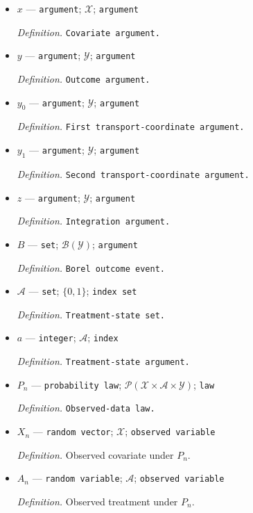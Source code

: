 \documentclass{article}
\begin{document}
\begin{itemize}
  \item \(x\) --- \texttt{argument}; \(\mathcal X\); \texttt{argument}
  \par\smallskip\noindent\emph{Definition.} \texttt{Covariate argument.}
  \item \(y\) --- \texttt{argument}; \(\mathcal Y\); \texttt{argument}
  \par\smallskip\noindent\emph{Definition.} \texttt{Outcome argument.}
  \item \(y_0\) --- \texttt{argument}; \(\mathcal Y\); \texttt{argument}
  \par\smallskip\noindent\emph{Definition.} \texttt{First transport-\allowbreak{}coordinate argument.}
  \item \(y_1\) --- \texttt{argument}; \(\mathcal Y\); \texttt{argument}
  \par\smallskip\noindent\emph{Definition.} \texttt{Second transport-\allowbreak{}coordinate argument.}
  \item \(z\) --- \texttt{argument}; \(\mathcal Y\); \texttt{argument}
  \par\smallskip\noindent\emph{Definition.} \texttt{Integration argument.}
  \item \(B\) --- \texttt{set}; \(\mathcal B(\mathcal Y)\); \texttt{argument}
  \par\smallskip\noindent\emph{Definition.} \texttt{Borel outcome event.}
  \item \(\mathcal A\) --- \texttt{set}; \(\{0,1\}\); \texttt{index set}
  \par\smallskip\noindent\emph{Definition.} \texttt{Treatment-\allowbreak{}state set.}
  \item \(a\) --- \texttt{integer}; \(\mathcal A\); \texttt{index}
  \par\smallskip\noindent\emph{Definition.} \texttt{Treatment-\allowbreak{}state argument.}
  \item \(P_n\) --- \texttt{probability law}; \(\mathcal P(\mathcal X\times\mathcal A\times\mathcal Y)\); \texttt{law}
  \par\smallskip\noindent\emph{Definition.} \texttt{Observed-\allowbreak{}data law.}
  \item \(X_n\) --- \texttt{random vector}; \(\mathcal X\); \texttt{observed variable}
  \par\smallskip\noindent\emph{Definition.} Observed covariate under \(P_n\).
  \item \(A_n\) --- \texttt{random variable}; \(\mathcal A\); \texttt{observed variable}
  \par\smallskip\noindent\emph{Definition.} Observed treatment under \(P_n\).

\end{itemize}
\end{document}
